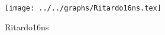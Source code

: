 \begin{figure}[h] \centering \texttt{[image: ../../graphs/Ritardo16ns.tex]}\caption{Ritardo16ns}\label{gr:Ritardo16ns} \end{figure}
